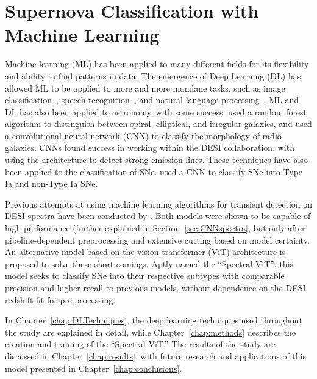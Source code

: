 \section{Supernova Classification with Machine Learning}
\label{sec:supernova-classification-with-machine-learning}
Machine learning (ML) has been applied to many different fields for its flexibility 
and ability to find patterns in data. The emergence of Deep Learning (DL) has
allowed ML to be applied to more and more mundane tasks, such as image
classification~\parencite{krizhevsky2012}, speech recognition~\parencite{Nassif2019},
and natural language processing~\parencite{Mikolov2013}. ML and DL 
has also been applied to astronomy, with some success. \textcite{Gauci2010} used 
a random forest algorithm  to distinguish between spiral, elliptical, and irregular galaxies, 
and \textcite{Becker2021} used a convolutional neural network (CNN) to classify the morphology of
radio galaxies. CNNs found success in working within the DESI collaboration, with 
\textcite{parks2018} using the architecture to detect strong emission lines.  
These techniques have also been applied to the classification of SNe. 
\textcite{Mller2016} used a CNN to classify SNe into Type Ia and non-Type Ia SNe. 

Previous attempts at using machine learning algorithms for transient detection on DESI 
spectra have been conducted by \textcite{wasserman2021, Sepeku2022}. Both models were 
shown to be capable of high performance (further explained in Section~\ref{sec:CNNspectra}, 
but only after pipeline-dependent preprocessing and extensive cutting based on model certainty.
An alternative model based on the vision transformer (ViT) architecture is proposed to 
solve these short comings. Aptly named the ``Spectral ViT'', this model seeks to 
classify SNe into their respective subtypes with comparable precision and higher 
recall to previous models, without dependence on the DESI redshift fit for pre-processing. 

In Chapter~\ref{chap:DLTechniques}, the deep learning techniques used throughout the study 
are explained in detail, while Chapter~\ref{chap:methods} describes the creation and training 
of the ``Spectral ViT.'' The results of the study are discussed in Chapter~\ref{chap:results}, with 
future research and applications of this model presented in Chapter~\ref{chap:conclusions}. 


